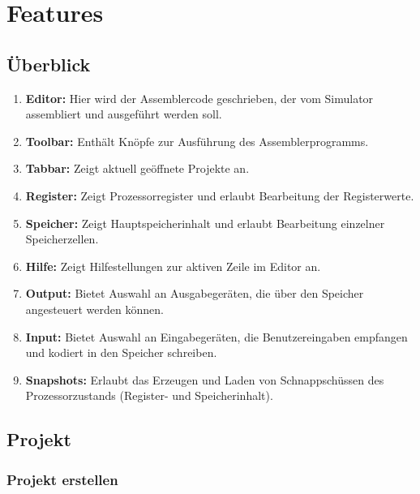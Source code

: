 
\section{Features}

\subsection*{Überblick}


\begin{enumerate}
\item \textbf{Editor:} Hier wird der Assemblercode geschrieben, der vom
Simulator assembliert und ausgeführt werden soll.
\item \textbf{Toolbar:} Enthält Knöpfe zur Ausführung des Assemblerprogramms.
\item \textbf{Tabbar:} Zeigt aktuell geöffnete Projekte an.
\item \textbf{Register:} Zeigt Prozessorregister und erlaubt Bearbeitung der
Registerwerte.
\item \textbf{Speicher:} Zeigt Hauptspeicherinhalt und erlaubt Bearbeitung
einzelner Speicherzellen.
\item \textbf{Hilfe:} Zeigt Hilfestellungen zur aktiven Zeile im Editor an.
\item \textbf{Output:} Bietet Auswahl an Ausgabegeräten, die über den Speicher
angesteuert werden können.
\item \textbf{Input:} Bietet Auswahl an Eingabegeräten, die Benutzereingaben
empfangen und kodiert in den Speicher schreiben.
\item \textbf{Snapshots:} Erlaubt das Erzeugen und Laden von Schnappschüssen
des Prozessorzustands (Register- und Speicherinhalt).
\end{enumerate}


\subsection{Projekt}

\subsubsection{Projekt erstellen}
\label{sec:project_creation}

